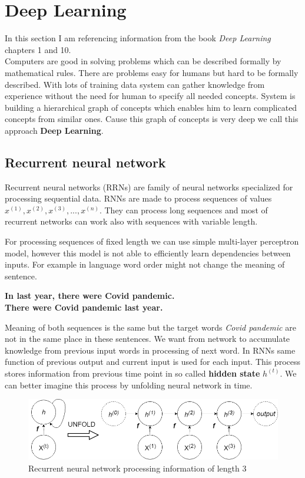\section{Deep Learning}

In this section I am referencing information from the book \textit{Deep Learning} \cite{Goodfellow-et-al-2016} chapters 1 and 10.
\\
Computers are good in solving problems which can be described formally by mathematical rules. There are problems easy for humans but hard to be formally described.  With lots of training data system can gather knowledge from experience without the need for human to specify all needed concepts. System is building a hierarchical graph of concepts which enables him to learn complicated concepts from similar ones. Cause this graph of concepts is very deep we call this approach \textbf{Deep Learning}.

\subsection{Recurrent neural network}

Recurrent neural networks (RRNs) are family of neural networks specialized for processing sequential data. RNNs are made to process sequences of values $ x^{(1)}, x^{(2)},x^{(3)}, ..., x^{(n)} $. They can process long sequences and most of recurrent networks can work also with sequences with variable length. 

For processing sequences of fixed length we can use simple multi-layer perceptron model, however this model is not able to efficiently learn  dependencies between inputs. For example in language word order might not change the meaning of sentence. 
\begin{center}
    \textbf{In last year, there were Covid pandemic.}\\
    \textbf{There were Covid pandemic last year.}
\end{center}
Meaning of both sequences is the same but the target words \textit{Covid pandemic} are not in the same place in these sentences. We want from network to accumulate knowledge from previous input words in processing of next word. In RNNs same function of previous output and current input is used for each input. This process stores information from previous time point in so called \textbf{hidden state} $h^{(t)}$. We can better imagine this process by unfolding neural network in time.

\begin{figure}[!h]
    \centering
    \includegraphics[width=140mm]{chapters/images/RNN_unfold.png}
    \caption{Recurrent neural network processing information of length 3}
    \label{fig:Unfold}
\end{figure}

